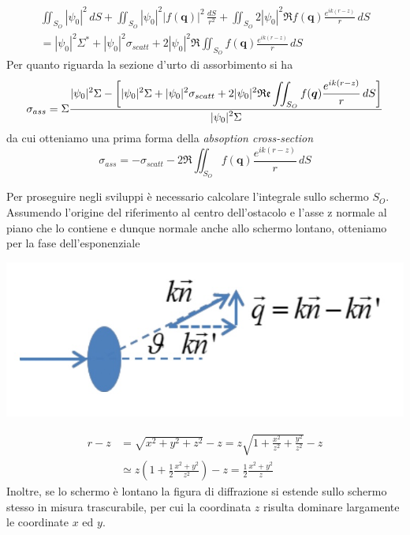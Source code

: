 \begin{gather*}
	\iint_{S_O} |\psi_0|^2 \, dS + \iint_{S_O}|\psi_0|^2 |f(\bm{q})|^2\, \frac{dS}{r^2} + \iint_{S_O}2 |\psi_0|^2 \Re f(\bm{q})\frac{e^{ik(r-z)}}{r} \, dS\\
	= |\psi_0|^2 \Sigma^* + |\psi_0|^2 \sigma_{scatt} + 2 |\psi_0|^2 \Re \iint_{S_O} f(\bm{q})\frac{e^{ik(r-z)}}{r} \,dS
\end{gather*}
Per quanto riguarda la sezione d'urto di assorbimento si ha
\[
	\sigma_{ass} = \Sigma   \fraclarg{|\psi_0|^2 \Sigma - \left[ |\psi_0|^2 \Sigma + |\psi_0|^2 \sigma_{scatt} +  2 |\psi_0|^2 \Re \iint_{S_O} f(\bm{q})\frac{e^{ik(r-z)}}{r} \,dS \right]}{|\psi_0|^2 \Sigma}
\]
da cui otteniamo una prima forma della \emph{absoption cross-section}
\begin{equation}
	\sigma_{ass} = - \sigma_{scatt} -  2  \Re \iint_{S_O} f(\bm{q})\frac{e^{ik(r-z)}}{r} \,dS
\end{equation}

Per proseguire negli sviluppi è necessario calcolare l'integrale sullo schermo $S_O$.
Assumendo l'origine del riferimento al centro dell'ostacolo e l'asse z normale al piano che lo contiene e dunque normale anche allo schermo lontano, otteniamo per la fase dell'esponenziale
\begin{marginfigure}
	\centering
	\includegraphics[width = 1.25 \textwidth, height = 1.25 \textheight]{figs/schema-vett-trasferito}
\end{marginfigure}
\begin{align*}
	r - z & = \sqrt{x^2 + y^2+z^2} -z = z\sqrt{1 + \frac{x^2}{z^2}+\frac{y^2}{z^2}} -z                       \\
	      & \simeq z \left( 1 + \frac{1}{2}\frac{x^2 + y^2}{z^2}\right) -z  = \frac{1}{2}\frac{x^2 + y^2}{z}
\end{align*}
Inoltre, se lo schermo è lontano la figura di diffrazione si estende sullo schermo stesso in misura trascurabile, per
cui la coordinata $z$ risulta dominare largamente le coordinate $x$ ed $y$.

